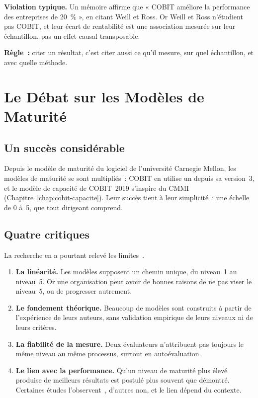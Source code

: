\begin{boxalert}
\textbf{Violation typique.} Un mémoire affirme que « COBIT améliore la
performance des entreprises de 20~\% », en citant Weill et Ross. Or Weill
et Ross n'étudient pas COBIT, et leur écart de rentabilité est une
association mesurée sur leur échantillon, pas un effet causal
transposable.

\smallskip
\textbf{Règle~:} citer un résultat, c'est citer aussi ce qu'il mesure, sur
quel échantillon, et avec quelle méthode.
\end{boxalert}

\section{Le Débat sur les Modèles de Maturité}
\label{sec:c20-maturite}

\subsection{Un succès considérable}

Depuis le modèle de maturité du logiciel de l'université Carnegie Mellon,
les modèles de maturité se sont multipliés~: COBIT en utilise un depuis
sa version~3, et le modèle de capacité de COBIT~2019 s'inspire du CMMI
(Chapitre~\ref{chap:cobit-capacite}). Leur succès tient à leur
simplicité~: une échelle de 0 à~5, que tout dirigeant comprend.

\subsection{Quatre critiques}

La recherche en a pourtant relevé les limites~\cite{becker2009maturity,poppelbuss2011maturity}.

\begin{enumerate}
    \item \textbf{La linéarité.} Les modèles supposent un chemin unique,
          du niveau~1 au niveau~5. Or une organisation peut avoir de bonnes
          raisons de ne pas viser le niveau~5, ou de progresser autrement.
    \item \textbf{Le fondement théorique.} Beaucoup de modèles sont construits
          à partir de l'expérience de leurs auteurs, sans validation
          empirique de leurs niveaux ni de leurs critères.
    \item \textbf{La fiabilité de la mesure.} Deux évaluateurs n'attribuent
          pas toujours le même niveau au même processus, surtout en
          autoévaluation.
    \item \textbf{Le lien avec la performance.} Qu'un niveau de maturité plus
          élevé produise de meilleurs résultats est postulé plus souvent que
          démontré. Certaines études l'observent~\cite{simonsson2010maturity},
          d'autres non, et le lien dépend du contexte.
\end{enumerate}

